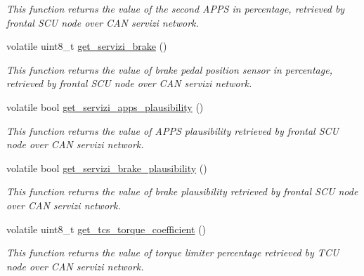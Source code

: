 \begin{DoxyCompactItemize}
\begin{DoxyCompactList}\small\item\em This function returns the value of the second A\-P\-P\-S in percentage, retrieved by frontal S\-C\-U node over C\-A\-N servizi network. \end{DoxyCompactList}\item 
volatile uint8\-\_\-t \hyperlink{group___c_a_n__servizi__group_ga21c09880bef645f24962658ef3dbb16e}{get\-\_\-servizi\-\_\-brake} ()
\begin{DoxyCompactList}\small\item\em This function returns the value of brake pedal position sensor in percentage, retrieved by frontal S\-C\-U node over C\-A\-N servizi network. \end{DoxyCompactList}\item 
volatile bool \hyperlink{group___c_a_n__servizi__group_ga66135a8978149fc6fa0b62446131ce95}{get\-\_\-servizi\-\_\-apps\-\_\-plausibility} ()
\begin{DoxyCompactList}\small\item\em This function returns the value of A\-P\-P\-S plausibility retrieved by frontal S\-C\-U node over C\-A\-N servizi network. \end{DoxyCompactList}\item 
volatile bool \hyperlink{group___c_a_n__servizi__group_ga064fdc5f825b2d50b1b13509e3f135d2}{get\-\_\-servizi\-\_\-brake\-\_\-plausibility} ()
\begin{DoxyCompactList}\small\item\em This function returns the value of brake plausibility retrieved by frontal S\-C\-U node over C\-A\-N servizi network. \end{DoxyCompactList}\item 
volatile uint8\-\_\-t \hyperlink{group___c_a_n__servizi__group_ga68bca94de95a77a3366f46eed661193f}{get\-\_\-tcs\-\_\-torque\-\_\-coefficient} ()
\begin{DoxyCompactList}\small\item\em This function returns the value of torque limiter percentage retrieved by T\-C\-U node over C\-A\-N servizi network. \end{DoxyCompactList}\end{DoxyCompactItemize}
